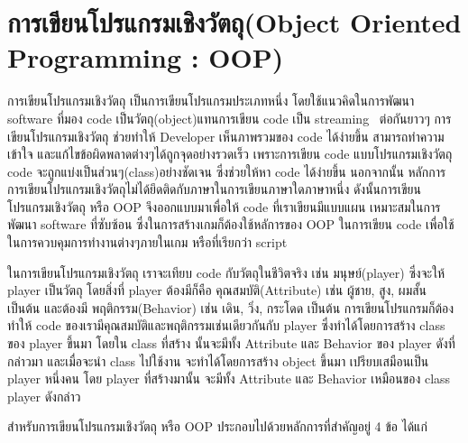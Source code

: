 \section{การเขียนโปรแกรมเชิงวัตถุ(Object Oriented Programming : OOP)}
\enskip \enskip \enskip \enskip \enskip การเขียนโปรแกรมเชิงวัตถุ เป็นการเขียนโปรแกรมประเภทหนึ่ง โดยใช้แนวคิดในการพัฒนา software 
ที่มอง code เป็นวัตถุ(object)แทนการเขียน code เป็น streaming~\cite{streaming} ต่อกันยาวๆ การเขียนโปรแกรมเชิงวัตถุ
ช่วยทำให้ Developer เห็นภาพรวมของ code ได้ง่ายขึ้น สามารถทำความเข้าใจ และแก้ไขข้อผิดพลาดต่างๆได้ถูกจุดอย่างรวดเร็ว 
เพราะการเขียน code แบบโปรแกรมเชิงวัตถุ code จะถูกแบ่งเป็นส่วนๆ(class)อย่างชัดเจน ซึ่งช่วยให้หา code ได้ง่ายขึ้น  
นอกจากนั้น หลักการการเขียนโปรแกรมเชิงวัตถุไม่ได้ยึดติดกับภาษาในการเขียนภาษาใดภาษาหนึ่ง ดังนั้นการเขียนโปรแกรมเชิงวัตถุ หรือ OOP จึงออกแบบมาเพื่อให้ code
ที่เราเขียนมีแบบแผน เหมาะสมในการพัฒนา software ที่ซับซ้อน ซึ่งในการสร้างเกมก็ต้องใช้หลัการของ OOP ในการเขียน code เพื่อใช้ในการควบคุมการทำงานต่างๆภายในเกม 
หรือที่เรียกว่า script

\enskip \enskip \enskip \enskip \enskip ในการเขียนโปรแกรมเชิงวัตถุ เราจะเทียบ code กับวัตถุในชีวิตจริง เช่น มนุษย์(player) ซึ่งจะให้ player เป็นวัตถุ 
โดยสิ่งที่ player ต้องมีก็คือ คุณสมบัติ(Attribute) เช่น ผู้ชาย, สูง, ผมสั้น เป็นต้น และต้องมี พฤติกรรม(Behavior) เช่น เดิน, วิ่ง, กระโดด เป็นต้น 
การเขียนโปรแกรมก็ต้องทำให้ code ของเรามีคุณสมบัติและพฤติกรรมเช่นเดียวกันกับ player ซึ่งทำได้โดยการสร้าง class ของ player ขึ้นมา โดยใน class ที่สร้าง
นั้นจะมีทั้ง Attribute และ Behavior ของ player ดังที่กล่าวมา และเมื่อจะนำ class ไปใช้งาน จะทำได้โดยการสร้าง object ขึ้นมา เปรียบเสมือนเป็น player หนึ่งคน
โดย player ที่สร้างมานั้น จะมีทั้ง Attribute และ Behavior เหมือนของ class player ดังกล่าว


\enskip \enskip \enskip \enskip \enskip สำหรับการเขียนโปรแกรมเชิงวัตถุ หรือ OOP ประกอบไปด้วยหลักการที่สำคัญอยู่ 4 ข้อ ได้แก่ 

